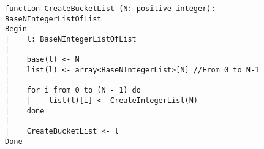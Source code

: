\begin{lstlisting}[breaklines]
function CreateBucketList (N: positive integer): BaseNIntegerListOfList
Begin
|    l: BaseNIntegerListOfList
|
|    base(l) <- N
|    list(l) <- array<BaseNIntegerList>[N] //From 0 to N-1
|
|    for i from 0 to (N - 1) do
|    |    list(l)[i] <- CreateIntegerList(N)
|    done
|
|    CreateBucketList <- l
Done
\end{lstlisting}
